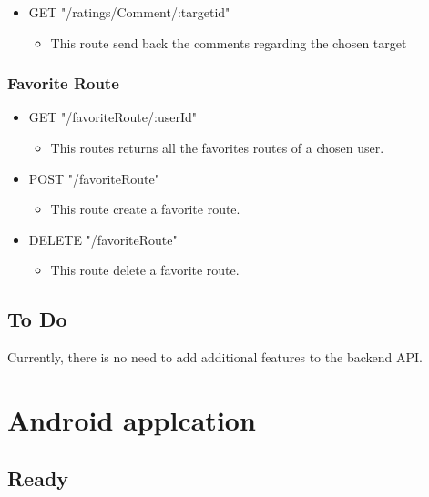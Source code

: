 \begin{itemize}
	\item GET "/ratings/Comment/:targetid"
	\begin{itemize}
		\item This route send back the comments regarding the chosen target
	\end{itemize}
\end{itemize}

\subsection{Favorite Route}
\begin{itemize}
	\item GET "/favoriteRoute/:userId"
	\begin{itemize}
		\item This routes returns all the favorites routes of a chosen user.
	\end{itemize}
\end{itemize}

\begin{itemize}
	\item POST "/favoriteRoute"
	\begin{itemize}
		\item This route create a favorite route.
	\end{itemize}
\end{itemize}

\begin{itemize}
	\item DELETE "/favoriteRoute"
	\begin{itemize}
		\item This route delete a favorite route.
	\end{itemize}
\end{itemize}

\section{To Do}

Currently, there is no need to add additional features to the backend API.

\chapter{Android applcation}

\section{Ready}

